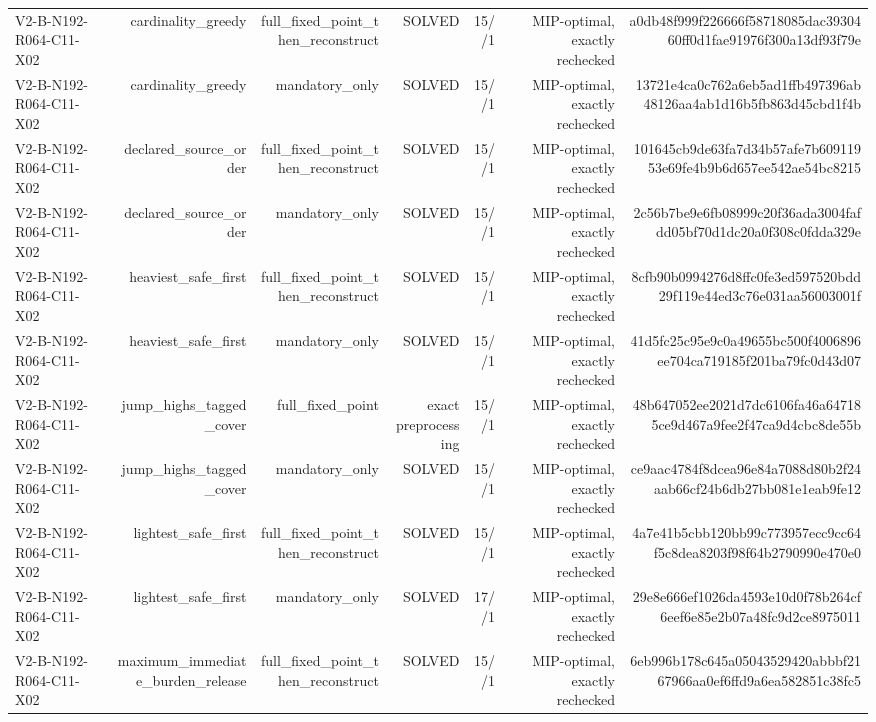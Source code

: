 {\begin{longtable}{lrrrrrr}
V2-B-N192-R064-C11-X02 & cardinality\_greedy & full\_fixed\_point\_then\_reconstruct & SOLVED & 15//1 & MIP-optimal, exactly rechecked & a0db48f999f226666f58718085dac3930460ff0d1fae91976f300a13df93f79e \\
V2-B-N192-R064-C11-X02 & cardinality\_greedy & mandatory\_only & SOLVED & 15//1 & MIP-optimal, exactly rechecked & 13721e4ca0c762a6eb5ad1ffb497396ab48126aa4ab1d16b5fb863d45cbd1f4b \\
V2-B-N192-R064-C11-X02 & declared\_source\_order & full\_fixed\_point\_then\_reconstruct & SOLVED & 15//1 & MIP-optimal, exactly rechecked & 101645cb9de63fa7d34b57afe7b60911953e69fe4b9b6d657ee542ae54bc8215 \\
V2-B-N192-R064-C11-X02 & declared\_source\_order & mandatory\_only & SOLVED & 15//1 & MIP-optimal, exactly rechecked & 2c56b7be9e6fb08999c20f36ada3004fafdd05bf70d1dc20a0f308c0fdda329e \\
V2-B-N192-R064-C11-X02 & heaviest\_safe\_first & full\_fixed\_point\_then\_reconstruct & SOLVED & 15//1 & MIP-optimal, exactly rechecked & 8cfb90b0994276d8ffc0fe3ed597520bdd29f119e44ed3c76e031aa56003001f \\
V2-B-N192-R064-C11-X02 & heaviest\_safe\_first & mandatory\_only & SOLVED & 15//1 & MIP-optimal, exactly rechecked & 41d5fc25c95e9c0a49655bc500f4006896ee704ca719185f201ba79fc0d43d07 \\
V2-B-N192-R064-C11-X02 & jump\_highs\_tagged\_cover & full\_fixed\_point & exact preprocessing & 15//1 & MIP-optimal, exactly rechecked & 48b647052ee2021d7dc6106fa46a647185ce9d467a9fee2f47ca9d4cbc8de55b \\
V2-B-N192-R064-C11-X02 & jump\_highs\_tagged\_cover & mandatory\_only & SOLVED & 15//1 & MIP-optimal, exactly rechecked & ce9aac4784f8dcea96e84a7088d80b2f24aab66cf24b6db27bb081e1eab9fe12 \\
V2-B-N192-R064-C11-X02 & lightest\_safe\_first & full\_fixed\_point\_then\_reconstruct & SOLVED & 15//1 & MIP-optimal, exactly rechecked & 4a7e41b5cbb120bb99c773957ecc9cc64f5c8dea8203f98f64b2790990e470e0 \\
V2-B-N192-R064-C11-X02 & lightest\_safe\_first & mandatory\_only & SOLVED & 17//1 & MIP-optimal, exactly rechecked & 29e8e666ef1026da4593e10d0f78b264cf6eef6e85e2b07a48fc9d2ce8975011 \\
V2-B-N192-R064-C11-X02 & maximum\_immediate\_burden\_release & full\_fixed\_point\_then\_reconstruct & SOLVED & 15//1 & MIP-optimal, exactly rechecked & 6eb996b178c645a05043529420abbbf2167966aa0ef6ffd9a6ea582851c38fc5 \\

\end{longtable}}
